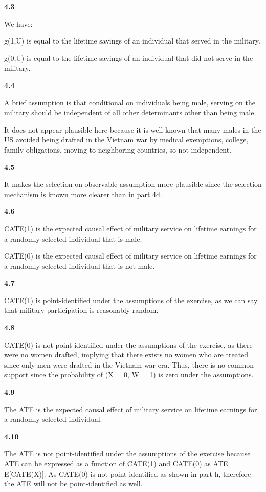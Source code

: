 \documentclass{article}
\begin{document}
\textbf{4.3}

We have:

g(1,U) is equal to the lifetime savings of an individual that served in the military.

g(0,U) is equal to the lifetime savings of an individual that did not serve in the military.

\textbf{4.4}

A brief assumption is that conditional on individuals being male, serving on the military should be independent of all other determinants other than being male.

It does not appear plausible here because it is well known that many males in the US avoided being drafted in the Vietnam war by medical exemptions, college, family obligations, moving to neighboring countries, so not independent.

\textbf{4.5}

It makes the selection on observable assumption more plausible since the selection mechanism is known more clearer than in part 4d.

\textbf{4.6}

CATE(1) is the expected causal effect of military service on lifetime earnings for a randomly selected individual that is male.

CATE(0) is the expected causal effect of military service on lifetime earnings for a randomly selected individual that is not male.

\textbf{4.7}

CATE(1) is point-identified under the assumptions of the exercise, as we can say that military participation is reasonably random. 

\textbf{4.8}

CATE(0) is not point-identified under the assumptions of the exercise, as there were no women drafted, implying that there exists no women who are treated since only men were drafted in the Vietnam war era. Thus, there is no common support since the probability of (X = 0, W = 1) is zero under the assumptions.

\textbf{4.9}

The ATE is the expected causal effect of military service on lifetime earnings for a randomly selected individual.

\textbf{4.10}

The ATE is not point-identified under the assumptions of the exercise because ATE can be expressed as a function of CATE(1) and CATE(0) as ATE = E[CATE(X)]. As CATE(0) is not point-identified as shown in part h, therefore the ATE will not be point-identified as well.
\end{document}
